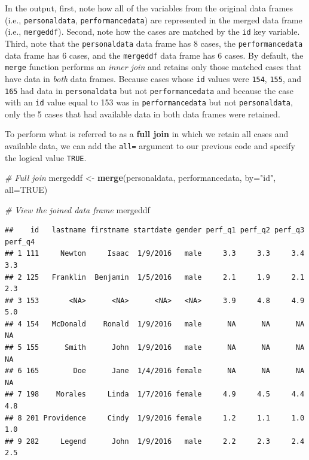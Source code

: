 \documentclass[]{book}
\newenvironment{Shaded}{\begin{snugshade}}{\end{snugshade}}
\newcommand{\KeywordTok}[1]{\textcolor[rgb]{0.13,0.29,0.53}{\textbf{#1}}}
\newcommand{\DataTypeTok}[1]{\textcolor[rgb]{0.13,0.29,0.53}{#1}}
\newcommand{\StringTok}[1]{\textcolor[rgb]{0.31,0.60,0.02}{#1}}
\newcommand{\CommentTok}[1]{\textcolor[rgb]{0.56,0.35,0.01}{\textit{#1}}}
\newcommand{\OtherTok}[1]{\textcolor[rgb]{0.56,0.35,0.01}{#1}}
\newcommand{\NormalTok}[1]{#1}
\begin{document}
In the output, first, note how all of the variables from the original
data frames (i.e., \texttt{personaldata}, \texttt{performancedata}) are
represented in the merged data frame (i.e., \texttt{mergeddf}). Second,
note how the cases are matched by the \texttt{id} key variable. Third,
note that the \texttt{personaldata} data frame has 8 cases, the
\texttt{performancedata} data frame has 6 cases, and the
\texttt{mergeddf} data frame has 6 cases. By default, the \texttt{merge}
function performs an \emph{inner join} and retains only those matched
cases that have data in \emph{both} data frames. Because cases whose
\texttt{id} values were \texttt{154}, \texttt{155}, and \texttt{165} had
data in \texttt{personaldata} but not \texttt{performancedata} and
because the case with an \texttt{id} value equal to 153 was in
\texttt{performancedata} but not \texttt{personaldata}, only the 5 cases
that had available data in both data frames were retained.

To perform what is referred to as a \textbf{full join} in which we
retain all cases and available data, we can add the \texttt{all=}
argument to our previous code and specify the logical value
\texttt{TRUE}.

\begin{Shaded}
\begin{Highlighting}[]
\CommentTok{# Full join}
\NormalTok{mergeddf <-}\StringTok{ }\KeywordTok{merge}\NormalTok{(personaldata, performancedata, }\DataTypeTok{by=}\StringTok{"id"}\NormalTok{, }\DataTypeTok{all=}\OtherTok{TRUE}\NormalTok{)}

\CommentTok{# View the joined data frame}
\NormalTok{mergeddf}
\end{Highlighting}
\end{Shaded}

\begin{verbatim}
##    id   lastname firstname startdate gender perf_q1 perf_q2 perf_q3 perf_q4
## 1 111     Newton     Isaac  1/9/2016   male     3.3     3.3     3.4     3.3
## 2 125   Franklin  Benjamin  1/5/2016   male     2.1     1.9     2.1     2.3
## 3 153       <NA>      <NA>      <NA>   <NA>     3.9     4.8     4.9     5.0
## 4 154   McDonald    Ronald  1/9/2016   male      NA      NA      NA      NA
## 5 155      Smith      John  1/9/2016   male      NA      NA      NA      NA
## 6 165        Doe      Jane  1/4/2016 female      NA      NA      NA      NA
## 7 198    Morales     Linda  1/7/2016 female     4.9     4.5     4.4     4.8
## 8 201 Providence     Cindy  1/9/2016 female     1.2     1.1     1.0     1.0
## 9 282     Legend      John  1/9/2016   male     2.2     2.3     2.4     2.5
\end{verbatim}
\end{document}

